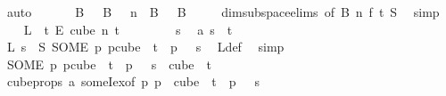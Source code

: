 \begin{isabellebody}
\ auto\isanewline
\ \ \isamarkupfalse%
\ \isamarkupfalse%
\ {}{\isacharcolon}{\kern0pt}\ {\isachardoublequoteopen}B\ {}\ {\isasymunion}\ B\ {}\ {\isacharequal}{\kern0pt}\ {\isacharbraceleft}{\kern0pt}{\isachardot}{\kern0pt}{\isachardot}{\kern0pt}{\isacharless}{\kern0pt}n{\isacharbraceright}{\kern0pt}\ {\isasymand}\ B\ {}\ {\isasyminter}\ B\ {}\ {\isacharequal}{\kern0pt}\ {\isacharbraceleft}{\kern0pt}{\isacharbraceright}{\kern0pt}{\isachardoublequoteclose}\ \isamarkupfalse%
\ dim{}{\isacharunderscore}{\kern0pt}subspace{\isacharunderscore}{\kern0pt}elims{\isacharparenleft}{\kern0pt}{}{\isacharcomma}{\kern0pt}\ {}{\isacharparenright}{\kern0pt}{\isacharbrackleft}{\kern0pt}of\ B\ n\ f\ t\ S{\isacharbrackright}{\kern0pt}\ \isamarkupfalse%
\ simp\isanewline
\isanewline
\ \ \isamarkupfalse%
\ {\isachardoublequoteopen}L\ {\isasymin}\ {\isacharbraceleft}{\kern0pt}{\isachardot}{\kern0pt}{\isachardot}{\kern0pt}{\isacharless}{\kern0pt}t{\isacharbraceright}{\kern0pt}\ {\isasymrightarrow}\isactrlsub E\ cube\ n\ t{\isachardoublequoteclose}\isanewline
\ \ \isamarkupfalse%
\isanewline
\ \ \ \ \isamarkupfalse%
\ s\ \isamarkupfalse%
\ a{\isacharcolon}{\kern0pt}\ {\isachardoublequoteopen}s\ {\isasymin}\ {\isacharbraceleft}{\kern0pt}{\isachardot}{\kern0pt}{\isachardot}{\kern0pt}{\isacharless}{\kern0pt}t{\isacharbraceright}{\kern0pt}{\isachardoublequoteclose}\isanewline
\ \ \ \ \isamarkupfalse%
\ \isamarkupfalse%
\ {\isachardoublequoteopen}L\ s\ {\isacharequal}{\kern0pt}\ S\ {\isacharparenleft}{\kern0pt}SOME\ p{\isachardot}{\kern0pt}\ p{\isasymin}cube\ {}\ t\ {\isasymand}\ p\ {}\ {\isacharequal}{\kern0pt}\ s{\isacharparenright}{\kern0pt}{\isachardoublequoteclose}\ \isamarkupfalse%
\ L{\isacharunderscore}{\kern0pt}def\ \isamarkupfalse%
\ simp\isanewline
\ \ \ \ \isamarkupfalse%
\ \isamarkupfalse%
\ {\isachardoublequoteopen}{\isacharparenleft}{\kern0pt}SOME\ p{\isachardot}{\kern0pt}\ p{\isasymin}cube\ {}\ t\ {\isasymand}\ p\ {}\ {\isacharequal}{\kern0pt}\ s{\isacharparenright}{\kern0pt}\ {\isasymin}\ cube\ {}\ t{\isachardoublequoteclose}\ \isamarkupfalse%
\ cube{\isacharunderscore}{\kern0pt}props{\isacharparenleft}{\kern0pt}{}{\isacharparenright}{\kern0pt}\ a\ someI{\isacharunderscore}{\kern0pt}ex{\isacharbrackleft}{\kern0pt}of\ {\isachardoublequoteopen}{\isasymlambda}p{\isachardot}{\kern0pt}\ p\ {\isasymin}\ cube\ {}\ t\ {\isasymand}\ p\ {}\ {\isacharequal}{\kern0pt}\ s{\isachardoublequoteclose}{\isacharbrackright}{\kern0pt}\ \isamarkupfalse%

\end{isabellebody}
